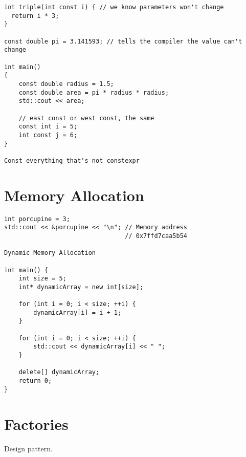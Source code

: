 \begin{verbatim}
int triple(int const i) { // we know parameters won't change
  return i * 3;
}

const double pi = 3.141593; // tells the compiler the value can't change

int main()
{
    const double radius = 1.5;
    const double area = pi * radius * radius;
    std::cout << area;

    // east const or west const, the same
    const int i = 5;
    int const j = 6;
}

Const everything that's not constexpr
\end{verbatim}


\section{Memory Allocation}

\begin{verbatim}
int porcupine = 3;
std::cout << &porcupine << "\n"; // Memory address
                                 // 0x7ffd7caa5b54

Dynamic Memory Allocation

int main() {
    int size = 5;
    int* dynamicArray = new int[size];

    for (int i = 0; i < size; ++i) {
        dynamicArray[i] = i + 1;
    }

    for (int i = 0; i < size; ++i) {
        std::cout << dynamicArray[i] << " ";
    }

    delete[] dynamicArray;
    return 0;
}
\end{verbatim}

\section{Factories}

Design pattern.

